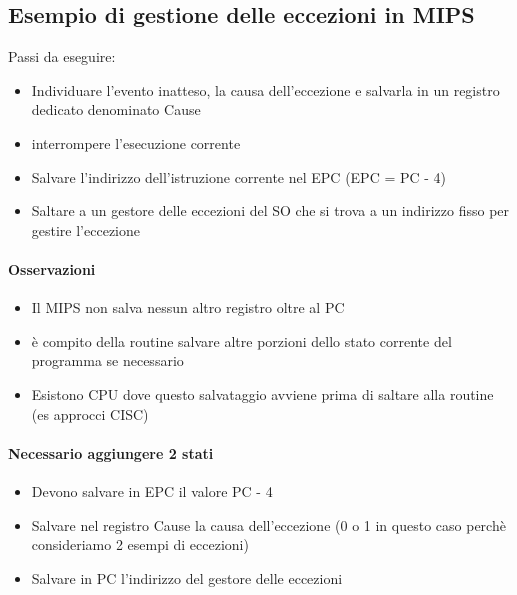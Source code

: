 \documentclass[12pt, a4paper, openany]{book}
\begin{document}
\subsection*{Esempio di gestione delle eccezioni in MIPS}
Passi da eseguire:
\begin{itemize}
    \item Individuare l'evento inatteso, la causa dell'eccezione e salvarla in un registro
    dedicato denominato Cause
    \item interrompere l'esecuzione corrente
    \item Salvare l'indirizzo dell'istruzione corrente nel EPC (EPC = PC - 4)
    \item Saltare a un gestore delle eccezioni del SO che si trova a un indirizzo
    fisso per gestire l'eccezione
\end{itemize}
\paragraph*{Osservazioni}
\begin{itemize}
    \item Il MIPS non salva nessun altro registro oltre al PC
    \item è compito della routine salvare altre porzioni dello stato corrente del programma
    se necessario
    \item Esistono CPU dove questo salvataggio avviene prima di saltare alla routine (es approcci CISC)
\end{itemize}

\paragraph*{Necessario aggiungere 2 stati} 
\begin{itemize}
    \item Devono salvare in EPC il valore PC - 4
    \item Salvare nel registro Cause la causa dell'eccezione (0 o 1 in questo caso perchè
    consideriamo 2 esempi di eccezioni)
    \item Salvare in PC l'indirizzo del gestore delle eccezioni
\end{itemize}
\end{document}
